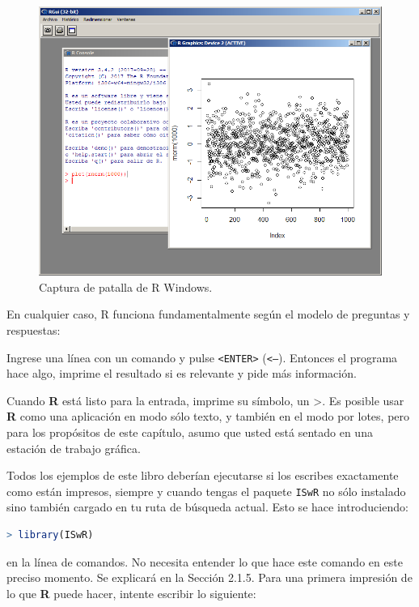 \begin{figure}[H]
  \includegraphics[width=\linewidth]{img/fig-1.png}
  \caption{Captura de patalla de R Windows.}
  \label{fig:fig-1}
\end{figure}

En cualquier caso, R funciona fundamentalmente según el modelo de
preguntas y respuestas:

Ingrese una línea con un comando y pulse \texttt{<ENTER>} (\texttt{<--}).
Entonces el programa hace algo, imprime el resultado si es relevante y pide más
información.

Cuando \textbf{R} está listo para la entrada, imprime su símbolo, un
\textquotedbl{}>\textquotedbl{}.  Es posible usar \textbf{R} como una
aplicación en modo sólo texto, y también en el modo por lotes, pero para los
propósitos de este capítulo, asumo que usted está sentado en una estación de
trabajo gráfica.

Todos los ejemplos de este libro deberían ejecutarse si los escribes
exactamente como están impresos, siempre y cuando tengas el paquete
\texttt{ISwR} no sólo instalado sino también cargado en tu ruta de búsqueda
actual. Esto se hace introduciendo:


\begin{lstlisting}[language=R]
> library(ISwR)
\end{lstlisting}

en la línea de comandos. No necesita entender lo que hace este comando en este
preciso momento. Se explicará en la Sección 2.1.5. Para una primera impresión de
lo que \textbf{R} puede hacer, intente escribir lo siguiente:

